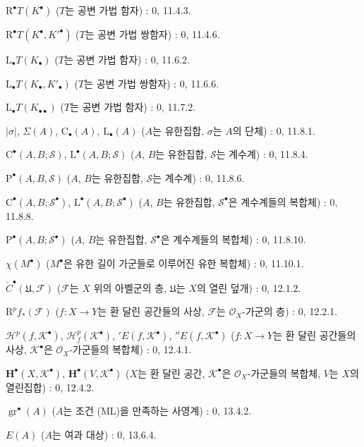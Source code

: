 \begin{flushleft}
$\mathrm R^\bullet T(K^\bullet)$ ($T$는 공변 가법 함자) : 0, 11.4.3.

$\mathrm R^\bullet T(K^\bullet,K'^{\bullet})$ ($T$는 공변 가법
쌍함자) : 0, 11.4.6.

$\mathrm L_\bullet T(K_\bullet)$ ($T$는 공변 가법 함자) : 0, 11.6.2.

$\mathrm L_\bullet T(K_\bullet,K'_\bullet)$ ($T$는 공변 가법
쌍함자) : 0, 11.6.6.

$\mathrm L_\bullet T(K_{\bullet\bullet})$ ($T$는 공변 가법 함자) :
0, 11.7.2.

$|\sigma|$, $\Sigma(A)$, $\mathrm C_\bullet(A)$, $\mathrm L_\bullet(A)$
($A$는 유한집합, $\sigma$는 $A$의 단체) : 0, 11.8.1.

$\mathrm C^\bullet(A,B;\mathscr S)$, $\mathrm L^\bullet(A,B;\mathscr S)$
($A$, $B$는 유한집합, $\mathscr S$는 계수계) : 0, 11.8.4.

$\mathrm P^\bullet(A,B,\mathscr S)$ ($A$, $B$는 유한집합,
$\mathscr S$는 계수계) : 0, 11.8.6.

$\mathrm C^\bullet(A,B;\mathscr S^\bullet)$,
$\mathrm L^\bullet(A,B;\mathscr S^\bullet)$ ($A$, $B$는 유한집합,
$\mathscr S^\bullet$은 계수계들의 복합체) : 0, 11.8.8.

$\mathrm P^\bullet(A,B;\mathscr S^\bullet)$ ($A$, $B$는 유한집합,
$\mathscr S^\bullet$은 계수계들의 복합체) : 0, 11.8.10.

$\chi(M^\bullet)$ ($M^\bullet$은 유한 길이 가군들로 이루어진 유한
복합체) : 0, 11.10.1.

$\check C^\bullet(\mathfrak U,\mathcal F)$ ($\mathcal F$는 $X$ 위의
아벨군의 층, $\mathfrak U$는 $X$의 열린 덮개) : 0, 12.1.2.

$\mathrm R^pf_*(\mathcal F)$ ($f:X\to Y$는 환 달린 공간들의 사상,
$\mathcal F$는 $\mathcal O_X$-가군의 층) : 0, 12.2.1.

$\mathcal H^p(f,\mathcal K^\bullet)$,
$\mathcal H_f^p(\mathcal K^\bullet)$, ${}'E(f,\mathcal K^\bullet)$,
${}''E(f,\mathcal K^\bullet)$ ($f:X\to Y$는 환 달린 공간들의 사상,
$\mathcal K^\bullet$은 $\mathcal O_X$-가군들의 복합체) : 0, 12.4.1.

$\mathbf H^\bullet(X,\mathcal K^\bullet)$,
$\mathbf H^\bullet(V,\mathcal K^\bullet)$ ($X$는 환 달린 공간,
$\mathcal K^\bullet$은 $\mathcal O_X$-가군들의 복합체, $V$는
$X$의 열린집합) : 0, 12.4.2.

$\operatorname{gr}^\bullet(A)$ ($A$는 조건 (ML)을 만족하는 사영계) :
0, 13.4.2.

$E(A)$ ($A$는 여과 대상) : 0, 13.6.4.


\end{flushleft}
